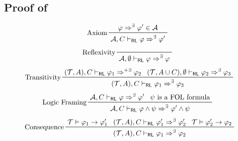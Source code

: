 \subsection{Proof of~}\label{app:crlsoundness}


\begin{figure}
    \centering
    \begin{align*}
        & \prftree[l]{Axiom}
          { \varphi \Rightarrow^{\exists} \varphi^\prime \in \mathcal{A} }
          { \mathcal{A}, C \vdash_\RL \varphi \Rightarrow^{\exists} \varphi^\prime }
    \end{align*}
    \begin{align*}
        & \prftree[l]{Reflexivity}
          { \mathcal{A}, \emptyset \vdash_\RL \varphi \Rightarrow^{\exists} \varphi }
    \end{align*}
    \begin{align*}
        & \prftree[l]{Transitivity}
          { (\mathcal{T}, A), C \vdash_\RL \varphi_1 \Rightarrow^{+ \exists} \varphi_2 }
          { (\mathcal{T}, A \cup C), \emptyset \vdash_\RL \varphi_2 \Rightarrow^{\exists} \varphi_3 }
          { (\mathcal{T}, A), C \vdash_\RL \varphi_1 \Rightarrow^{\exists} \varphi_3 }
    \end{align*}
    \begin{align*}
        & \prftree[l]{Logic Framing}
          { \mathcal{A}, C \vdash_\RL \varphi \Rightarrow^{\exists} \varphi^\prime }
          { \psi \mbox{ is a FOL formula} }
          { \mathcal{A}, C \vdash_\RL \varphi \land \psi \Rightarrow^{\exists} \varphi^\prime \land \psi }
    \end{align*}
    \begin{align*}
        & \prftree[l]{Consequence}
          { \mathcal{T} \vDash \varphi_1 \rightarrow \varphi_1^\prime }
          { (\mathcal{T}, A), C \vdash_\RL \varphi_1^\prime \Rightarrow^{\exists} \varphi_2^\prime }
          { \mathcal{T} \vDash \varphi_2^\prime \rightarrow \varphi_2 }
          { (\mathcal{T}, A), C \vdash_\RL \varphi_1 \Rightarrow^{\exists} \varphi_2 }
    \end{align*}

\end{figure}
